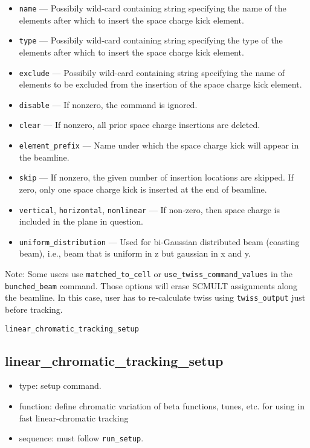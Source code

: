 \documentclass[11pt]{article}
\begin{document}
\begin{itemize}
\item \verb|name| --- Possibily wild-card containing string specifying the
	name of the elements after which to insert the space charge kick element.
\item \verb|type| --- Possibily wild-card containing string specifying the
        type of the elements after which to insert the space charge kick element.
\item \verb|exclude| --- Possibily wild-card containing string specifying 
	the name of elements to be excluded from the insertion of the space charge kick element.
\item \verb|disable| --- If nonzero, the command is ignored.
\item \verb|clear| --- If nonzero, all prior space charge insertions are deleted.
\item \verb|element_prefix| --- Name under which the space charge kick will appear in the beamline.
\item \verb|skip| --- If nonzero, the given number of insertion locations are skipped. 
        If zero, only one space charge kick is inserted at the end of beamline. 
\item \verb|vertical|, \verb|horizontal|, \verb|nonlinear| --- If non-zero, then space charge is
included in the plane in question.
\item \verb|uniform_distribution| --- Used for bi-Gaussian distributed beam (coasting beam), i.e., beam that is
  uniform in z but gaussian in x and y.
\end{itemize}

Note: Some users use \verb|matched_to_cell| or
\verb|use_twiss_command_values| in the \verb|bunched_beam|
command. Those options will erase SCMULT assignments along the
beamline. In this case, user has to re-calculate twiss using
\verb|twiss_output| just before tracking.

\newpage
\begin{center}{\Large\verb|linear_chromatic_tracking_setup|}\end{center}
\subsection{linear\_chromatic\_tracking\_setup \label{subsec:linearchromatictrackingsetup}}

\begin{itemize}
\item type: setup command.
\item function: define chromatic variation of beta functions, tunes, etc. for using in
 fast linear-chromatic tracking
\item sequence: must follow \verb|run_setup|.
\end{itemize}
\end{document}
